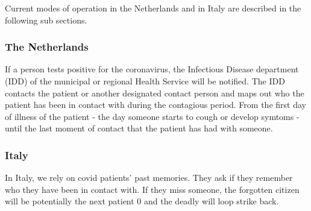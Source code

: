 Current modes of operation in the Netherlands\cite{bib3} and in Italy are described in the following sub sections.\\
{\color{PineGreen}\subsubsection{The Netherlands}}
If a person tests positive for the coronavirus, the Infectious Disease department (IDD) of the municipal or regional Health Service will be notified. The IDD contacts the patient or another designated contact person and maps out who the patient has been in contact with during the contagious period. From the first day of illness of the patient - the day someone starts to cough or develop symtoms - until the last moment of contact that the patient has had with someone.
\\
{\color{PineGreen}\subsubsection{Italy}}
In Italy, we rely on covid patients' past memories. They ask if they remember who they have been in contact with. If they miss someone, the forgotten citizen will be potentially the next patient 0 and the deadly will loop strike back.
